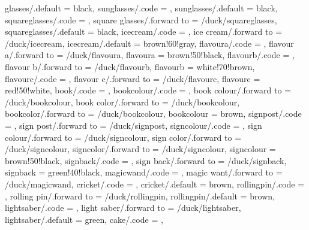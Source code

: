 {  glasses/.default          = black,
  sunglasses/.code          = \duck@sunglassestrue  
                              \def\duck@sunglasses{#1},
  sunglasses/.default       = black, 
  squareglasses/.code       = \duck@squareglassestrue 
                              \def\duck@squareglasses{#1},
  square glasses/.forward to = /duck/squareglasses,
  squareglasses/.default    = black,
  icecream/.code            = \duck@icecreamtrue    
                              \def\duck@cone{#1},
  ice cream/.forward to     = /duck/icecream,
  icecream/.default         = brown!60!gray,
  flavoura/.code            = \def\duck@flavoura{#1},
  flavour a/.forward to     = /duck/flavoura,
  flavoura                  = brown!50!black,
  flavourb/.code            = \def\duck@flavourb{#1},
  flavour b/.forward to     = /duck/flavourb,
  flavourb                  = white!70!brown,
  flavourc/.code            = \def\duck@flavourc{#1},
  flavour c/.forward to     = /duck/flavourc,
  flavourc                  = red!50!white,
  book/.code                = \duck@booktrue        
                              \def\duck@book{#1},
  bookcolour/.code          = \def\duck@bookcolour{#1},
  book colour/.forward to   = /duck/bookcolour,
  book color/.forward to    = /duck/bookcolour,
  bookcolor/.forward to     = /duck/bookcolour,
  bookcolour                = brown,
  signpost/.code            = \duck@signposttrue    
                              \def\duck@signpost{#1},
  sign post/.forward to     = /duck/signpost,
  signcolour/.code          = \def\duck@signcolour{#1},
  sign colour/.forward to   = /duck/signcolour,
  sign color/.forward to    = /duck/signcolour,
  signcolor/.forward to     = /duck/signcolour,  
  signcolour                = brown!50!black,
  signback/.code            = \def\duck@signback{#1},
  sign back/.forward to     = /duck/signback,
  signback                  = green!40!black,
  magicwand/.code           = \duck@magicwandtrue,
  magic want/.forward to    = /duck/magicwand,
  cricket/.code             = \duck@crickettrue     
                              \def\duck@cricket{#1},
  cricket/.default          = brown,
  rollingpin/.code          = \duck@rollingpintrue  
                              \def\duck@rollingpin{#1},
  rolling pin/.forward to   = /duck/rollingpin,
  rollingpin/.default       = brown,
  lightsaber/.code          = \duck@lightsabertrue  
                              \def\duck@lightsaber{#1},
  light saber/.forward to   = /duck/lightsaber,
  lightsaber/.default       = green,
  cake/.code                = \duck@caketrue        
                              \def\duck@cake{#1},
}
